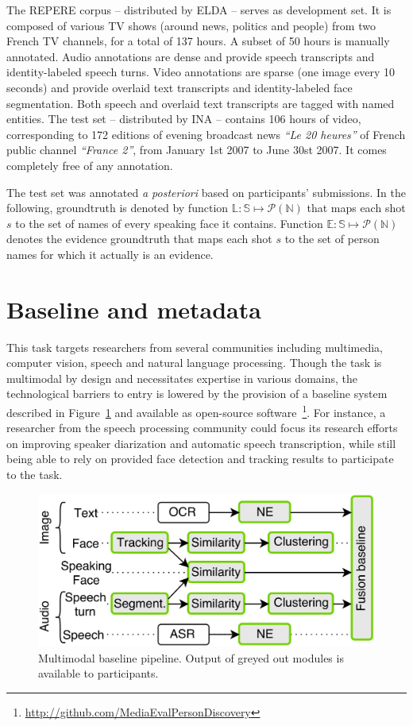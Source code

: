 \documentclass{acm_proc_article-me}
\newcommand\refEvidences{\mathbb{E}}
\newcommand\refLabels{\mathbb{L}}
\newcommand\refNames{\mathbb{N}}
\newcommand\shots{\mathbb{S}}
\begin{document}
The REPERE corpus -- distributed by ELDA -- serves as development set. It is composed of various TV shows (around news, politics and people) from two French TV channels, for a total of 137 hours. A subset of 50 hours is manually annotated. Audio annotations are dense and provide speech transcripts and identity-labeled speech turns. Video annotations are sparse (one image every 10 seconds) and provide overlaid text transcripts and identity-labeled face segmentation. Both speech and overlaid text transcripts are tagged with named entities.
The test set -- distributed by INA -- contains 106 hours of video, corresponding to 172 editions of evening broadcast news \emph{``Le 20 heures''} of French public channel \emph{``France 2''}, from January 1st 2007 to June 30st 2007. It comes completely free of any annotation.

The test set was annotated \emph{a posteriori} based on participants' submissions. In the following, groundtruth is denoted by function $\refLabels : \shots \mapsto \mathcal{P}(\refNames)$ that maps each shot $s$ to the set of names of every speaking face it contains. Function $\refEvidences : \shots \mapsto \mathcal{P}(\refNames)$ denotes the evidence groundtruth that maps each shot $s$ to the set of person names for which it actually is an evidence.

\section{Baseline and metadata}

This task targets researchers from several communities including multimedia, computer vision, speech and natural language processing. Though the task is multimodal by design and necessitates expertise in various domains, the technological barriers to entry is lowered by the provision of a baseline system described in Figure~\ref{fig:baseline} and available as open-source software~\footnote{\url{http://github.com/MediaEvalPersonDiscovery}}.
For instance, a researcher from the speech processing community could focus its research efforts on improving speaker diarization and automatic speech transcription, while still being able to rely on provided face detection and tracking results to participate to the task.

\begin{figure}[htb]
 \center
 \includegraphics[width=1\linewidth]{figs/baseline.png}
 \centering
 \caption {Multimodal baseline pipeline. Output of greyed out modules is available to participants.}
 \label{fig:baseline}
\end{figure}
\end{document}
